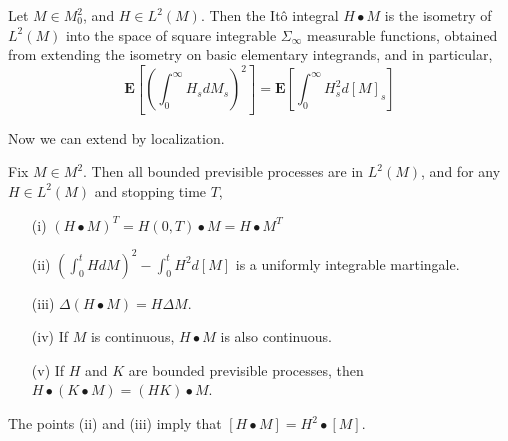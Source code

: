 \begin{theorem}
    Let $M \in M_0^2$, and $H \in L^2(M)$. Then the It\^{o} integral $H \bullet M$ is the isometry of $L^2(M)$ into the space of square integrable $\Sigma_\infty$ measurable functions, obtained from extending the isometry on basic elementary integrands, and in particular,
    \[ \mathbf{E} \left[ \left( \int_0^\infty H_s dM_s \right)^2 \right] = \mathbf{E} \left[ \int_0^\infty H_s^2 d[M]_s \right] \]
\end{theorem}

Now we can extend by localization.

\begin{theorem}
    Fix $M \in M^2$. Then all bounded previsible processes are in $L^2(M)$, and for any $H \in L^2(M)$ and stopping time $T$,
    \begin{itemize}
        \item[(i)] $(H \bullet M)^T = H(0,T) \bullet M = H \bullet M^T$
        \item[(ii)] $\left( \int_0^t H dM \right)^2 - \int_0^t H^2 d[M]$ is a uniformly integrable martingale.
        \item[(iii)] $\Delta(H \bullet M) = H \Delta M$.
        \item[(iv)] If $M$ is continuous, $H \bullet M$ is also continuous.
        \item[(v)] If $H$ and $K$ are bounded previsible processes, then $H \bullet (K \bullet M) = (HK) \bullet M$.
    \end{itemize}
    The points (ii) and (iii) imply that $[H \bullet M] = H^2 \bullet [M]$.
\end{theorem}
